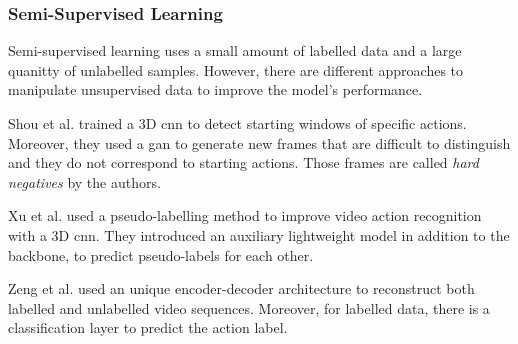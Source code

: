 \subsubsection*{Semi-Supervised Learning}
Semi-supervised learning uses a small amount of labelled data and a large 
quanitty of unlabelled samples. However, there are different approaches to 
manipulate unsupervised data to improve the model's performance.

Shou et al. \cite{shou_gan} trained a 3D \ac{cnn} to detect starting windows 
of specific actions. Moreover, they used a \ac{gan} to generate new frames 
that are difficult to distinguish and they do not correspond to starting actions.
Those frames are called \emph{hard negatives} by the authors.

Xu et al. \cite{xu_pl_var} used a pseudo-labelling method to improve video 
action recognition with a 3D \ac{cnn}. They introduced an auxiliary lightweight 
model in addition to the backbone, to predict pseudo-labels for each other.

Zeng et al. \cite{zenc_enc_dec_ssl} used an unique encoder-decoder architecture 
to reconstruct both labelled and unlabelled video sequences.
Moreover, for labelled data, there is a classification layer to predict the 
action label.